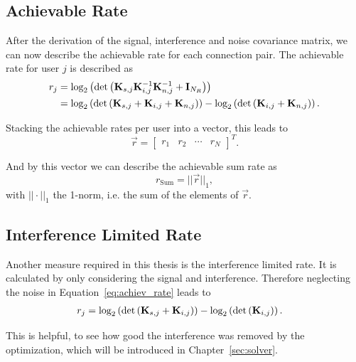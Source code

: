 \subsection{Achievable Rate}
\label{sec:achiev_rate}
After the derivation of the signal, interference and noise covariance matrix, we can now describe the achievable rate for each connection pair.
The achievable rate for user $j$ is described as
\begin{align}
\label{eq:achiev_rate}
\nonumber
r_j &= \text{log}_2\left(\text{det}\left(\mathbf{K}_{s,j}\mathbf{K}_{i,j}^{-1}\mathbf{K}_{n,j}^{-1}+\mathbf{I}_{N_R}\right)\right)\\
 &=\text{log}_2\left(\text{det}\left(\mathbf{K}_{s,j}+\mathbf{K}_{i,j}+\mathbf{K}_{n,j}\right)\right) -
	     	\text{log}_2\left(\text{det}\left(\mathbf{K}_{i,j}+\mathbf{K}_{n,j}\right)\right).
\end{align}

Stacking the achievable rates per user into a vector, this leads to 
\begin{equation}
\label{eq:achiev_vec}
\vec{r} =
\begin{bmatrix}
r_1 & r_2 & \cdots & r_N
\end{bmatrix}^T.
\end{equation}

And by this vector we can describe the achievable sum rate as
\begin{equation}
\label{eq:achiev_sum_rate}
r_\text{Sum} = ||\vec{r}||_1,
\end{equation}
with $||\cdot||_1$ the 1-norm, i.e. the sum of the elements of $\vec{r}$.

\subsection{Interference Limited Rate}
\label{sec:sir_rate}
Another measure required in this thesis is the interference limited rate.
It is calculated by only considering the signal and interference.
Therefore neglecting the noise in Equation~\ref{eq:achiev_rate} leads to
\begin{align}
\label{eq:sir_rate}
r_j &=\text{log}_2\left(\text{det}\left(\mathbf{K}_{s,j}+\mathbf{K}_{i,j}\right)\right) -
	     	\text{log}_2\left(\text{det}\left(\mathbf{K}_{i,j}\right)\right).
\end{align}

This is helpful, to see how good the interference was removed by the optimization, which will be introduced in Chapter~\ref{sec:solver}.



